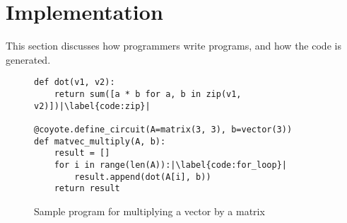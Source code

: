 \section{Implementation}\label{sec:implementation}

This section discusses how programmers write \system programs, and how the code is generated.

  


\begin{figure}
    \small
    \begin{verbatim}
def dot(v1, v2):
    return sum([a * b for a, b in zip(v1, v2)])|\label{code:zip}|
  
@coyote.define_circuit(A=matrix(3, 3), b=vector(3))
def matvec_multiply(A, b):
    result = []
    for i in range(len(A)):|\label{code:for_loop}|
        result.append(dot(A[i], b))
    return result
    \end{verbatim}
    \vspace{-1em}
    \caption{Sample \system program for multiplying a vector by a matrix}\label{fig:coyote-program}
\end{figure}

            
  
